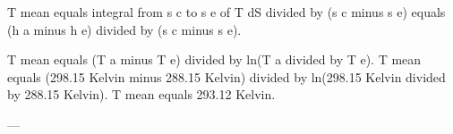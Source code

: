 T mean equals integral from s c to s e of T dS divided by (s c minus s e) equals (h a minus h e) divided by (s c minus s e).  

T mean equals (T a minus T e) divided by ln(T a divided by T e).  
T mean equals (298.15 Kelvin minus 288.15 Kelvin) divided by ln(298.15 Kelvin divided by 288.15 Kelvin).  
T mean equals 293.12 Kelvin.  

---